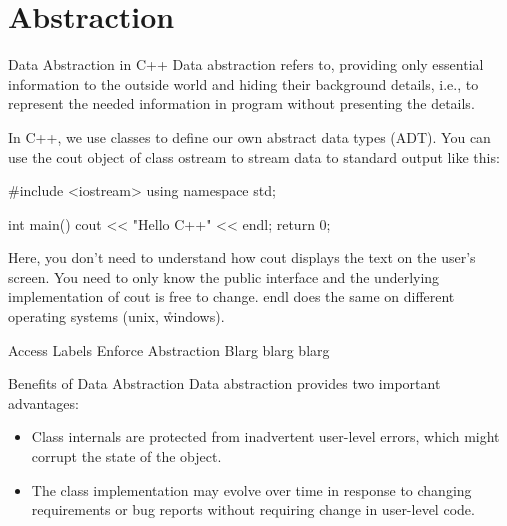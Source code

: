 \documentclass[../lecture5-objectorientation.tex]{subfiles}
\begin{document}
\section{Abstraction}


\begin{frame}[fragile]{Data Abstraction in C++}
    Data abstraction refers to, providing only essential information to the outside world and hiding their background details, i.e., to represent the needed information in program without presenting the details. \newline

    In C++, we use classes to define our own abstract data types (ADT). You can use the cout object of class ostream to stream data to standard output like this: \newline

    \begin{cppcode}[lastline=8]
#include <iostream>
using namespace std;

int main()
{
    cout << "Hello C++" << endl;
    return 0;
}
    \end{cppcode}

    \note
    {
        Here, you don't need to understand how cout displays the text on the user's screen. You need to only know the public interface and the underlying implementation of cout is free to change. endl does the same on different operating systems (\n unix, \r windows).
    }
\end{frame}


\begin{frame}[fragile]{Access Labels Enforce Abstraction}
    Blarg blarg blarg
\end{frame}


\begin{frame}[fragile]{Benefits of Data Abstraction}
    Data abstraction provides two important advantages:

    \begin{itemize}
        \item Class internals are protected from inadvertent user-level errors, which might corrupt the state of the object.
        \item The class implementation may evolve over time in response to changing requirements or bug reports without requiring change in user-level code.
    \end{itemize}
\end{frame}
\end{document}
